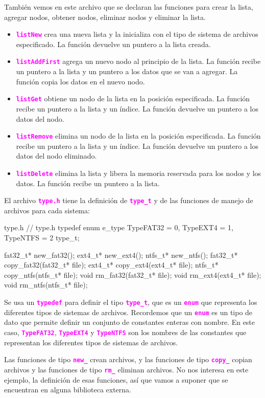 \documentclass[]{scrartcl}
\newcommand{\hl}[1]{\textcolor{magenta}{\textbf{\texttt{#1}}}}
\begin{document}
También vemos en este archivo que se declaran las funciones para crear la lista, agregar nodos, obtener nodos, eliminar nodos y eliminar la lista.
\begin{itemize}
  \item \hl{listNew} crea una nueva lista y la inicializa con el tipo de sistema de archivos especificado. La función devuelve un puntero a la lista creada.
  \item \hl{listAddFirst} agrega un nuevo nodo al principio de la lista. La función recibe un puntero a la lista y un puntero a los datos que se van a agregar. La función copia los datos en el nuevo nodo.
  \item \hl{listGet} obtiene un nodo de la lista en la posición especificada. La función recibe un puntero a la lista y un índice. La función devuelve un puntero a los datos del nodo.
  \item \hl{listRemove} elimina un nodo de la lista en la posición especificada. La función recibe un puntero a la lista y un índice. La función devuelve un puntero a los datos del nodo eliminado.
  \item \hl{listDelete} elimina la lista y libera la memoria reservada para los nodos y los datos. La función recibe un puntero a la lista.
\end{itemize}

El archivo \hl{type.h} tiene la definición de \hl{type\_t} y de las funciones de manejo de archivos para cada sistema:

\begin{cbox}[]{type.h}
  // type.h
  typedef enum e_type {
    TypeFAT32 = 0,
    TypeEXT4 = 1,
    TypeNTFS = 2
  } type_t;

  fat32_t* new_fat32();
  ext4_t* new_ext4();
  ntfs_t* new_ntfs();          
  fat32_t* copy_fat32(fat32_t* file);
  ext4_t* copy_ext4(ext4_t* file);
  ntfs_t* copy_ntfs(ntfs_t* file);
  void rm_fat32(fat32_t* file);
  void rm_ext4(ext4_t* file);
  void rm_ntfs(ntfs_t* file);
\end{cbox}

Se usa un \hl{typedef} para definir el tipo \hl{type\_t}, que es un \hl{enum} que representa los diferentes tipos de sistemas de archivos. Recordemos que un \hl{enum} es un tipo de dato que permite definir un conjunto de constantes enteras con nombre. En este caso, \hl{TypeFAT32}, \hl{TypeEXT4} y \hl{TypeNTFS} son los nombres de las constantes que representan los diferentes tipos de sistemas de archivos.

Las funciones de tipo \hl{new\_} crean archivos, y las funciones de tipo \hl{copy\_} copian archivos y las funciones de tipo \hl{rm\_} eliminan archivos. No nos interesa en este ejemplo, la definición de esas funciones, así que vamos a suponer que se encuentran en alguna biblioteca externa.
\end{document}
